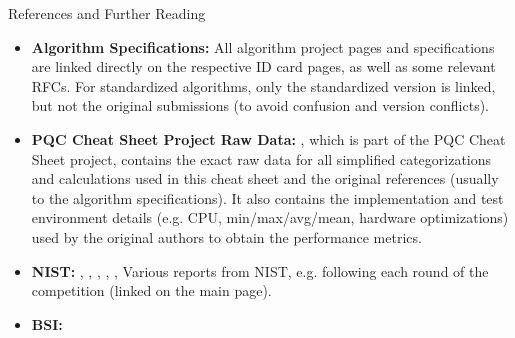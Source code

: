 



\vspace{-5mm}
\begin{algorithmbox}{References and Further Reading}
	\scriptsize
	\begin{itemize}
		\item {\bfseries Algorithm Specifications:} All algorithm project pages and specifications are linked directly on the respective ID card pages, as well as some relevant RFCs. For standardized algorithms, only the standardized version is linked, but not the original submissions (to avoid confusion and version conflicts).

		\item {\bfseries PQC Cheat Sheet Project Raw Data:} , which is part of the PQC Cheat Sheet project, contains the exact raw data for all simplified categorizations and calculations used in this cheat sheet and the original references (usually to the algorithm specifications). It also contains the implementation and test environment details (e.g. CPU, min/max/avg/mean, hardware optimizations) used by the original authors to obtain the performance metrics.

		\item {\bfseries NIST:} , , , , , Various reports from NIST, e.g. following each round of the competition (linked on the main page).

		\item {\bfseries BSI:} 


\end{itemize}
\end{algorithmbox}
